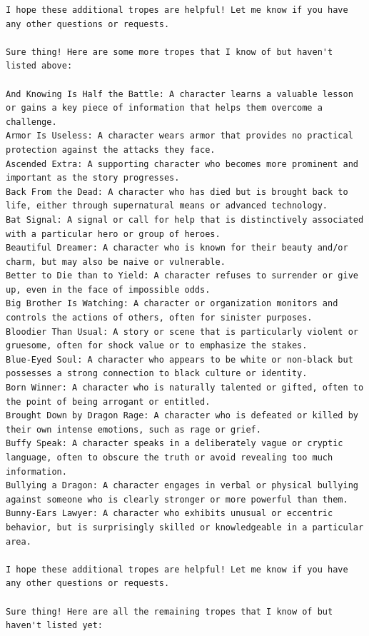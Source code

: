 \documentclass[11pt]{article}
\begin{document}
\begin{lstlisting}
I hope these additional tropes are helpful! Let me know if you have any other questions or requests.

Sure thing! Here are some more tropes that I know of but haven't listed above:

And Knowing Is Half the Battle: A character learns a valuable lesson or gains a key piece of information that helps them overcome a challenge.
Armor Is Useless: A character wears armor that provides no practical protection against the attacks they face.
Ascended Extra: A supporting character who becomes more prominent and important as the story progresses.
Back From the Dead: A character who has died but is brought back to life, either through supernatural means or advanced technology.
Bat Signal: A signal or call for help that is distinctively associated with a particular hero or group of heroes.
Beautiful Dreamer: A character who is known for their beauty and/or charm, but may also be naive or vulnerable.
Better to Die than to Yield: A character refuses to surrender or give up, even in the face of impossible odds.
Big Brother Is Watching: A character or organization monitors and controls the actions of others, often for sinister purposes.
Bloodier Than Usual: A story or scene that is particularly violent or gruesome, often for shock value or to emphasize the stakes.
Blue-Eyed Soul: A character who appears to be white or non-black but possesses a strong connection to black culture or identity.
Born Winner: A character who is naturally talented or gifted, often to the point of being arrogant or entitled.
Brought Down by Dragon Rage: A character who is defeated or killed by their own intense emotions, such as rage or grief.
Buffy Speak: A character speaks in a deliberately vague or cryptic language, often to obscure the truth or avoid revealing too much information.
Bullying a Dragon: A character engages in verbal or physical bullying against someone who is clearly stronger or more powerful than them.
Bunny-Ears Lawyer: A character who exhibits unusual or eccentric behavior, but is surprisingly skilled or knowledgeable in a particular area.

I hope these additional tropes are helpful! Let me know if you have any other questions or requests.

Sure thing! Here are all the remaining tropes that I know of but haven't listed yet:


\end{lstlisting}
\end{document}
